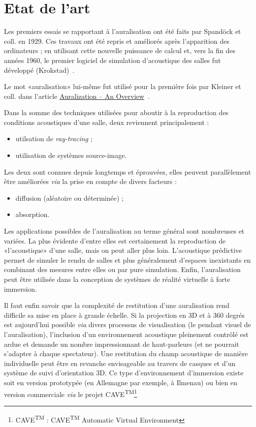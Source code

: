\chapter{Etat de l'art}

Les premiers essais se rapportant à l'auralisation ont été faits par Spandöck et coll. en 1929.
Ces travaux ont été repris et améliorés après l'apparition des ordinateurs ; en utilisant cette nouvelle puissance de
calcul et, vers la fin des années 1960, le premier logiciel de simulation d'acoustique des salles fut développé
(Krokstad)~\cite{Vor08}.

Le mot «auralisation» lui-même fut utilisé pour la première fois par Kleiner et coll. dans l'article
\underline{Auralization -- An Overview}~\cite{Kle93}.

Dans la somme des techniques utilisées pour aboutir à la reproduction des conditions acoustiques d'une salle, deux
reviennent principalement :

\begin{itemize}
    \item utilsation de \textit{ray-tracing} ;
    \item utilisation de systèmes source-image.
\end{itemize}

Les deux sont connues depuis longtemps et éprouvées, elles peuvent parallèlement être améliorées \textit{via} la prise en compte de
divers facteurs :

\begin{itemize}
    \item diffusion (aléatoire ou déterminée) ;
    \item absorption.
\end{itemize}

Les applications possibles de l'auralisation au terme général sont nombreuses et variées. La plus évidente d'entre
elles est certainement la reproduction de «l'acoustique» d'une salle, mais on peut aller plus loin. L'acoustique
prédictive permet de simuler le rendu de salles et plus généralement d'espaces inexistants en combinant des mesures
entre elles ou par pure simulation. Enfin, l'auralisation peut être utilisée dans la conception de systèmes de
réalité virtuelle à forte immersion.

Il faut enfin savoir que la complexité de restitution d'une auralisation rend difficile sa mise en place à grande échelle. Si
la projection en 3D et à 360 degrés est aujourd'hui possible \textit{via} divers processus de visualisation (le pendant
visuel de l'auralisation), l'inclusion d'un environnement acoustique pleinement contrôlé est ardue  et
demande un nombre impressionnant de haut-parleurs (et ne pourrait s'adapter à chaque spectateur). Une restitution du
champ acoustique de manière individuelle peut être en revanche envisageable au travers de casques et d'un système de
suivi d'orientation 3D. Ce type d'environnement d'immersion existe soit en version prototypée (en Allemagne par exemple,
à Ilmenau) ou bien en version commerciale \textit{via} le projet
CAVE\textsuperscript{TM}\footnote{CAVE\textsuperscript{\textsc{TM}} :
    CAVE\textsuperscript{\textsc{TM}} Automatic Virtual
Environment}
